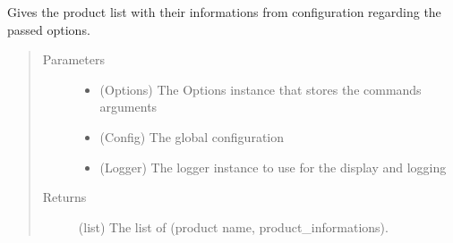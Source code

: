 \documentclass[a4paper,10pt,english]{sphinxmanual}
\begin{document}

\begin{fulllineitems}
\label{\detokenize{apidoc_commands/commands:commands.script.get_products_list}}
Gives the product list with their informations from 
configuration regarding the passed options.
\begin{quote}\begin{description}
\item[{Parameters}] \leavevmode\begin{itemize}
\item {} 
 \textendash{} (Options) 
The Options instance that stores the commands arguments

\item {} 
 \textendash{} (Config) The global configuration

\item {} 
 \textendash{} (Logger) 
The logger instance to use for the display and logging

\end{itemize}

\item[{Returns}] \leavevmode
(list) The list of (product name, product\_informations).

\end{description}\end{quote}

\end{fulllineitems}

\end{document}
